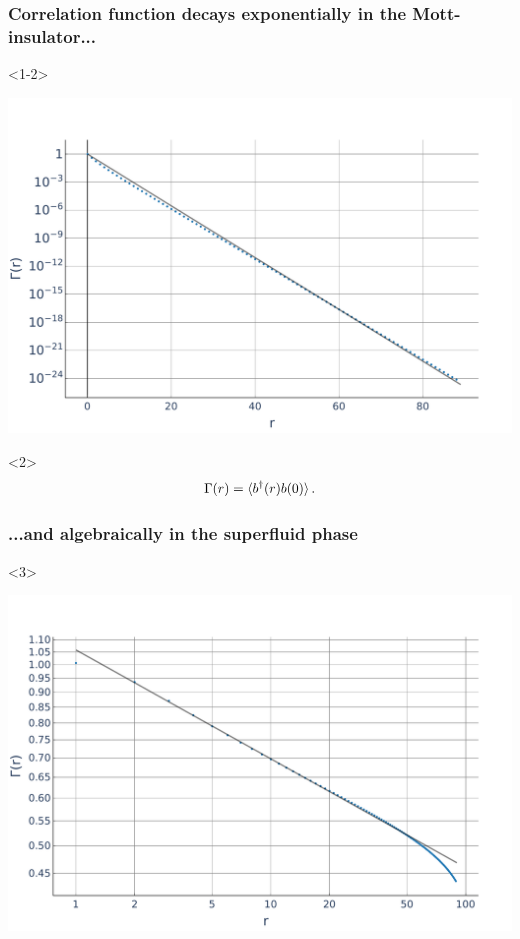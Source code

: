 \documentclass[aspectratio=169]{beamer}
\begin{document}
\begin{frame}
  \frametitle<1-2>{Correlation function decays exponentially in the Mott-insulator...}
  \begin{onlyenv}<1-2>
    \begin{center}
      \includegraphics[scale=0.22]{../img/Correlations-MI1.pdf}
    \end{center}
  \end{onlyenv}
  \begin{onlyenv}<2>
    \begin{equation}\label{eq:correlation decay}
      \Gamma(r) = \langle b^\dagger(r)b(0)\rangle \thinspace .
    \end{equation}
  \end{onlyenv}
  \frametitle<3>{...and algebraically in the superfluid phase}
  \begin{onlyenv}<3>
    \begin{center}
      \includegraphics[scale=0.22]{../img/Correlations-SF1.pdf}

\end{center}
\end{onlyenv}
\end{frame}
\end{document}
